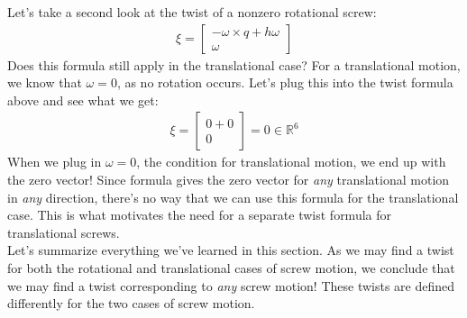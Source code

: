 \documentclass[oneside]{book}
\begin{document}
Let's take a second look at the twist of a nonzero rotational screw: \begin{align}
    \xi = \begin{bmatrix}
    -\omega\times q + h\omega\\
    \omega
    \end{bmatrix}
\end{align}
Does this formula still apply in the translational case? For a translational motion, we know that $\omega = 0$, as no rotation occurs. Let's plug this into the twist formula above and see what we get:
\begin{align}
    \xi = \begin{bmatrix}
    0 + 0\\
    0
    \end{bmatrix} = 0 \in \mathbb{R}^6
\end{align}
When we plug in $\omega = 0$, the condition for translational motion, we end up with the zero vector! Since formula gives the zero vector for \textit{any} translational motion in \textit{any} direction, there's no way that we can use this formula for the translational case. This is what motivates the need for a separate twist formula for translational screws.\\
Let's summarize everything we've learned in this section. As we may find a twist for both the rotational and translational cases of screw motion, we conclude that we may find a twist corresponding to \textit{any} screw motion! These twists are defined differently for the two cases of screw motion.
\end{document}
